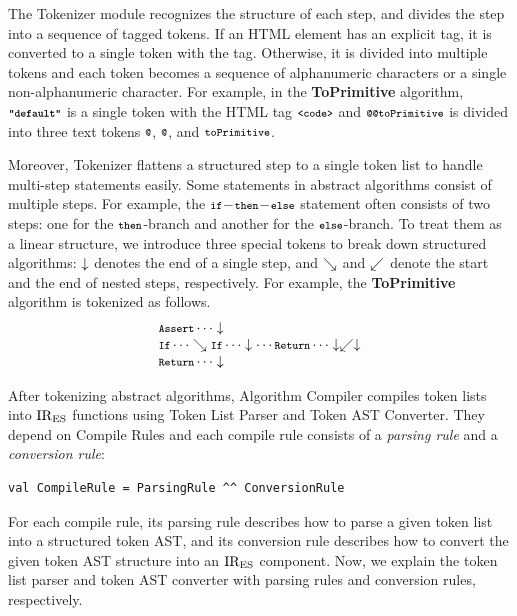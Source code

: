 The {\sf Tokenizer} module recognizes the structure of each step,
and divides the step into a sequence of tagged tokens.
If an HTML element has an explicit tag, it is converted to a single token
with the tag.  Otherwise, it is divided into multiple tokens and each token
becomes a sequence of alphanumeric characters or a single non-alphanumeric
character.  For example, in the \textbf{\small ToPrimitive} algorithm,
\( \textbf{\texttt{\footnotesize"default"}} \) is a single token with the HTML tag \( \texttt{\footnotesize<code>} \)
and \( \code{@@toPrimitive} \) is divided into three text tokens
\( \code{@} \), \( \code{@} \), and \( \texttt{\footnotesize toPrimitive} \).

Moreover, {\sf Tokenizer} flattens a structured step to a single token
list to handle multi-step statements easily.  Some statements in
abstract algorithms consist of multiple steps.  For example, the
\( \texttt{\footnotesize if}\!-\!\texttt{\footnotesize then}\!-\!\texttt{\footnotesize else} \) statement often consists of
two steps: one for the \( \texttt{\footnotesize then} \)-branch and another
for the \( \texttt{\footnotesize else} \)-branch.  To treat them as a linear structure,
we introduce three special tokens to break down structured algorithms:
\( \downarrow \) denotes the end of a single step, and \( \searrow \) and
\( \swarrow \) denote the start and the end of nested steps, respectively.
For example, the \textbf{\small ToPrimitive} algorithm is tokenized as follows.
\[
  \begin{array}{l}
    \texttt{\footnotesize Assert} \cdots \downarrow\\
    \texttt{\footnotesize If} \cdots \searrow \texttt{\footnotesize If} \cdots \downarrow
    \cdots \texttt{\footnotesize Return} \cdots \downarrow \swarrow \downarrow\\
    \texttt{\footnotesize Return} \cdots \downarrow\\
  \end{array}
\]

After tokenizing abstract algorithms, {\sf Algorithm Compiler}
compiles token lists into \( \text{IR}_\text{ES} \) functions using
{\sf Token List Parser} and {\sf Token AST Converter}.
They depend on {\sf Compile Rules} and each compile rule
consists of a \textit{parsing rule} and a \textit{conversion rule}:
\begin{lstlisting}[style=myScalastyle]
val CompileRule = ParsingRule ^^ ConversionRule
\end{lstlisting}
For each compile rule, its parsing rule describes how to parse a given
token list into a structured token AST, and its conversion rule describes
how to convert the given token AST structure into an \( \text{IR}_\text{ES} \) component.
Now, we explain the token list parser and token AST converter with
parsing rules and conversion rules, respectively.

